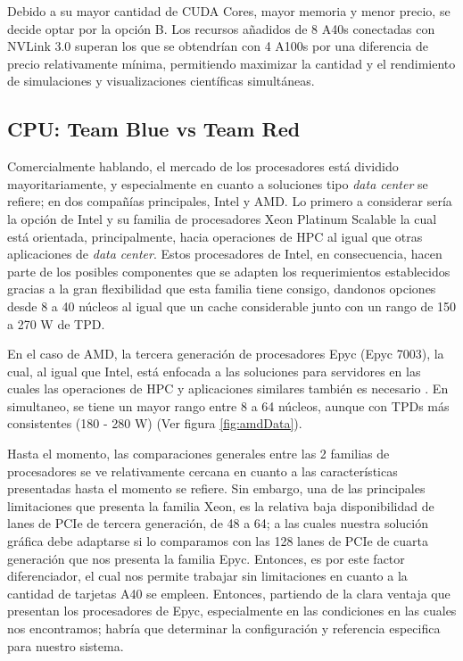 \documentclass[conference,onecolumn]{IEEEtran}
\begin{document}
Debido a su mayor cantidad de CUDA Cores, mayor memoria y menor precio, se decide optar por la opción B. Los recursos añadidos de 8 A40s conectadas con NVLink 3.0 superan los que se obtendrían con 4 A100s por una diferencia de precio relativamente mínima, permitiendo maximizar la cantidad y el rendimiento de simulaciones y visualizaciones científicas simultáneas.


\subsection{CPU: Team Blue vs Team Red}
Comercialmente hablando, el mercado de los procesadores está dividido mayoritariamente, y especialmente en cuanto a soluciones tipo \textit{data center} se refiere; en dos compañías principales, Intel y AMD. Lo primero a considerar sería la opción de Intel y su familia de procesadores Xeon Platinum Scalable la cual está orientada, principalmente, hacia operaciones de HPC al igual que otras aplicaciones de \textit{data center}. Estos procesadores de Intel, en consecuencia, hacen parte de los posibles componentes que se adapten los requerimientos establecidos gracias a la gran flexibilidad que esta familia tiene consigo, dandonos opciones desde 8 a 40 núcleos al igual que un cache considerable junto con un rango de 150 a 270 W de TPD. \cite{intelPlat, intelXeonHPC, intelXeon} \medbreak 
  
En el caso de AMD, la tercera generación de procesadores Epyc (Epyc 7003), la cual, al igual que Intel, está enfocada a las soluciones para servidores en las cuales las operaciones de HPC y aplicaciones similares también es necesario \cite{AMDHPC}. En simultaneo, se tiene un mayor rango entre 8 a 64 núcleos, aunque con TPDs más consistentes (180 - 280 W) (Ver figura \ref{fig:amdData}). \medbreak

Hasta el momento, las comparaciones generales entre las 2 familias de procesadores se ve relativamente cercana en cuanto a las características presentadas hasta el momento se refiere. Sin embargo, una de las principales limitaciones que presenta la familia Xeon, es la relativa baja disponibilidad de lanes de PCIe de tercera generación, de 48 a 64; a las cuales nuestra solución gráfica debe adaptarse si lo comparamos con las 128 lanes de PCIe de cuarta generación que nos presenta la familia Epyc. Entonces, es por este factor diferenciador, el cual nos permite trabajar sin limitaciones en cuanto a la cantidad de tarjetas A40 se empleen. Entonces, partiendo de la clara ventaja que presentan los procesadores de Epyc, especialmente en las condiciones en las cuales nos encontramos; habría que determinar la configuración y referencia especifica para nuestro sistema. \medbreak
\end{document}
